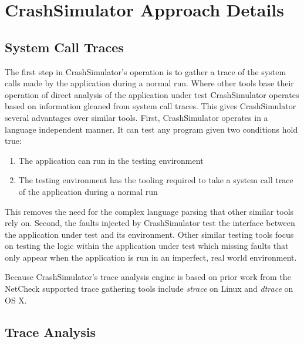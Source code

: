 \section{CrashSimulator Approach Details}

    \subsection{System Call Traces}

    The first step in CrashSimulator's operation is to gather a trace of the system
    calls made by the application during a normal run. Where other tools base their operation of direct analysis of the
    application under test CrashSimulator operates based on information gleaned from system call traces. This gives
    CrashSimulator several advantages over similar tools. First, CrashSimulator operates in a language independent
    manner. It can test any program given two conditions hold true:

    \begin{enumerate}
        \item{The application can run in the testing environment}
        \item{The testing environment has the tooling required to take a system call trace of the application during a
        normal run}
    \end{enumerate}

    This removes the need for the complex language parsing that other similar tools rely on. Second, the faults injected
    by CrashSimulator test the interface between the application under test and its environment. Other similar testing
    tools focus on testing the logic within the application under test which missing faults that only appear when the
    application is run in an imperfect, real world environment.

    Because CrashSimulator's trace analysis engine is based on prior work from the NetCheck supported trace gathering
    tools include \emph{strace} on Linux and \emph{dtrace} on OS X.

    \subsection{Trace Analysis}



